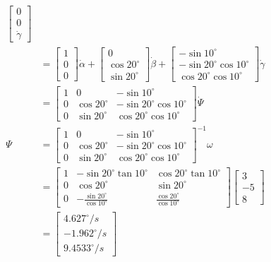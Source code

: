 \documentclass[UTF8, 13pt]{ctexart}
\begin{document}
\[\begin{aligned}
        \begin{bmatrix}
            0 \\
            0 \\
            \dot{\gamma}
        \end{bmatrix} \\
    &= \begin{bmatrix}
        1 \\
        0 \\
        0
        \end{bmatrix} \dot{\alpha}
        + \begin{bmatrix}
            0 \\
            \cos20^\circ \\
            \sin20^\circ
        \end{bmatrix} \dot{\beta}
        + \begin{bmatrix}
            -\sin10^\circ \\
            -\sin20^\circ \cos10^\circ \\
            \cos20^\circ \cos10^\circ
        \end{bmatrix} \dot{\gamma} \\
    &= \begin{bmatrix}
        1 & 0 & -\sin10^\circ \\
        0 & \cos20^\circ & -\sin20^\circ \cos10^\circ \\
        0 & \sin20^\circ & \cos20^\circ \cos10^\circ
    \end{bmatrix} \dot{\Psi} \\
    \Psi &= \begin{bmatrix}
            1 & 0 & -\sin10^\circ \\
            0 & \cos20^\circ & -\sin20^\circ \cos10^\circ \\
            0 & \sin20^\circ & \cos20^\circ \cos10^\circ
        \end{bmatrix}^{-1} \omega \\
    &= \begin{bmatrix}
            1 & -\sin20^\circ \tan10^\circ & \cos20^\circ \tan10^\circ \\
            0 & \cos20^\circ & \sin20^\circ \\
            0 & -\frac{\sin20^\circ}{\cos10^\circ} & \frac{\cos20^\circ}{\cos10^\circ}
        \end{bmatrix}
        \begin{bmatrix}
            3 \\
            -5 \\
            8
        \end{bmatrix} \\
    &= \begin{bmatrix}
        4.627^\circ /s \\
        -1.962^\circ /s \\
        9.4533^\circ /s
        \end{bmatrix} \\
\end{aligned}
\]
\newpage
\end{document}
